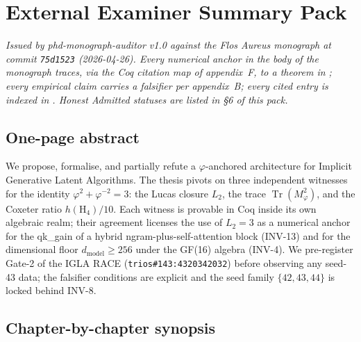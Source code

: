 %

\chapter*{External Examiner Summary Pack}
\label{app:examiner-pack}

\noindent\emph{Issued by phd-monograph-auditor v1.0 against the Flos Aureus
monograph at commit \texttt{75d1523} (2026-04-26). Every numerical anchor in
the body of the monograph traces, via the Coq citation map of
appendix~F, to a theorem in ; every
empirical claim carries a falsifier per appendix~B; every cited entry is
indexed in . Honest \emph{Admitted}
statuses are listed in §6 of this pack.}

\section{One-page abstract}

We propose, formalise, and partially refute a $\varphi$-anchored
architecture for Implicit Generative Latent Algorithms. The thesis pivots on
three independent witnesses for the identity $\varphi^{2}+\varphi^{-2}=3$:
the Lucas closure $L_{2}$, the trace $\operatorname{Tr}(M_{\varphi}^{2})$,
and the Coxeter ratio $h(\mathrm{H}_{4})/10$. Each witness is provable in
Coq inside its own algebraic realm; their agreement licenses the use of
$L_{2}=3$ as a numerical anchor for the qk\_gain of a hybrid
ngram-plus-self-attention block (INV-13) and for the dimensional floor
$d_{\mathrm{model}}\!\geq\!256$ under the GF(16) algebra (INV-4). We
pre-register Gate-2 of the IGLA RACE
(\texttt{trios\#143:4320342032}) before observing any seed-43 data; the
falsifier conditions are explicit and the seed family $\{42,43,44\}$ is
locked behind INV-8.

\section{Chapter-by-chapter synopsis}

